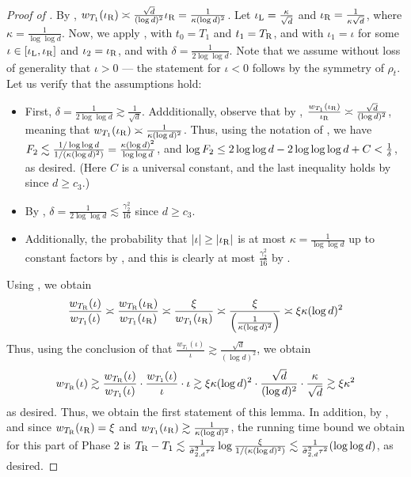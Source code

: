 \begin{proof}[Proof of ]
By , $w_{T_1}(\iota_{\textup{R}}) \asymp \frac{\sqrt{d}}{(\log d)^2} \iota_{\textup{R}} = \frac{1}{\kappa (\log d)^2}$. Let $\iota_{\textup{L}} = \frac{\kappa}{\sqrt{d}}$ and $\iota_{\textup{R}} = \frac{1}{\kappa \sqrt{d}}$, where $\kappa = \frac{1}{\log \log d}$. Now, we apply , with $t_0 = T_1$ and $t_1 = {T_{\textup{R}}}$, and with $\iota_1 = \iota$ for some $\iota \in [\iota_{\textup{L}}, \iota_{\textup{R}}]$ and $\iota_2 = \iota_{\textup{R}}$, and with $\delta = \frac{1}{2 \log \log d}$. Note that we assume without loss of generality that $\iota > 0$ --- the statement for $\iota < 0$ follows by the symmetry of $\rho_t$. Let us verify that the assumptions hold:
\begin{itemize}
\item First, $\delta = \frac{1}{2 \log \log d} \gtrsim \frac{1}{\sqrt{d}}$. Addditionally, observe that by , $\frac{w_{T_1}(\iota_{\textup{R}})}{\iota_{\textup{R}}} \asymp \frac{\sqrt{d}}{(\log d)^2}$, meaning that $w_{T_1}(\iota_{\textup{R}}) \asymp \frac{1}{\kappa (\log d)^2}$. Thus, using the notation of , we have $F_2 \lesssim \frac{1/\log \log d}{1/(\kappa(\log d)^2)} = \frac{\kappa (\log d)^2}{\log \log d}$, and $\log F_2 \leq 2 \log \log d - 2 \log \log \log d + C < \frac{1}{\delta}$, as desired. (Here $C$ is a universal constant, and the last inequality holds by  since $d \geq c_3$.)
\item By , $\delta = \frac{1}{2 \log \log d} \lesssim \frac{\gamma_2^2}{16}$ since $d \geq c_3$.
\item Additionally, the probability that $|\iota| \geq |\iota_{\textup{R}}|$ is at most $\kappa = \frac{1}{\log \log d}$ up to constant factors by , and this is clearly at most $\frac{\gamma_2^2}{16}$ by . 
\end{itemize}
Using , we obtain
\begin{align}
\frac{w_{{T_{\textup{R}}}}(\iota)}{w_{T_1}(\iota)} 
\asymp \frac{w_{{T_{\textup{R}}}}(\iota_{\textup{R}})}{w_{T_1}(\iota_{\textup{R}})} 
\asymp \frac{\xi}{w_{T_1}(\iota_{\textup{R}})} 
\asymp \frac{\xi}{\Big(\frac{1}{\kappa (\log d)^2}\Big)} 
\asymp \xi \kappa (\log d)^2
\end{align}
Thus, using the conclusion of  that $\frac{w_{T_1}(\iota)}{\iota} \gtrsim \frac{\sqrt{d}}{(\log d)^2}$, we obtain
\begin{align}
w_{{T_{\textup{R}}}}(\iota) 
\gtrsim \frac{w_{{T_{\textup{R}}}}(\iota)}{w_{T_1}(\iota)} \cdot \frac{w_{T_1}(\iota)}{\iota} \cdot \iota 
\gtrsim \xi \kappa (\log d)^2 \cdot \frac{\sqrt{d}}{(\log d)^2} \cdot \frac{\kappa}{\sqrt{d}} 
\gtrsim \xi \kappa^2
\end{align}
as desired. Thus, we obtain the first statement of this lemma. In addition, by , and since $w_{{T_{\textup{R}}}}(\iota_{\textup{R}}) = \xi$ and $w_{T_1}(\iota_{\textup{R}}) \gtrsim \frac{1}{\kappa(\log d)^2}$, the running time bound we obtain for this part of Phase 2 is ${T_{\textup{R}}} - T_1 \lesssim \frac{1}{\hat{\sigma}_{2, d}^2 \tau^2} \log \frac{\xi}{1/(\kappa (\log d)^2)} \lesssim \frac{1}{\hat{\sigma}_{2, d}^2 \tau^2} (\log \log d)$, as desired.
\end{proof}

